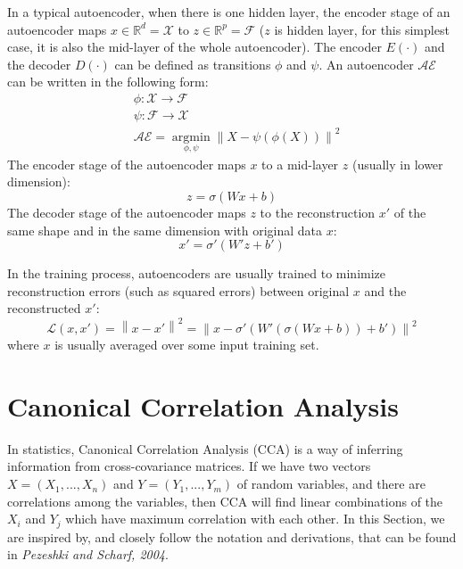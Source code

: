 \documentclass[12pt]{report} %
\newcommand{\norm}[1]{\left\lVert #1 \right\rVert}
\begin{document}
In a typical autoencoder, when there is one hidden layer, the encoder stage of an autoencoder maps \(x\in \mathbb{R}^{d}=\mathcal{X}\) to \(z\in \mathbb{R}^{p}=\mathcal{F}\) ($z$ is hidden layer, for this simplest case, it is also the mid-layer of the whole autoencoder). The encoder \(E(\cdot)\) and the decoder \(D(\cdot)\) can be defined as transitions $\phi$ and $\psi$. An autoencoder $\mathcal{AE}$ can be written in the following form:
\begin{equation}
\begin{split}
& \phi:\mathcal{X}\to\mathcal{F} \\
& \psi:\mathcal{F}\to\mathcal{X} \\
& \mathcal{AE}=\operatorname*{argmin}_{\phi,\psi} \norm{X-\psi(\phi(X))}^2
\end{split}
\end{equation}
The encoder stage of the autoencoder maps $x$ to a mid-layer $z$ (usually in lower dimension):
\begin{equation}
z=\sigma(Wx+b)
\end{equation}
The decoder stage of the autoencoder maps $z$ to the reconstruction $x'$  of the same shape and in the same dimension with original data $x$:
\begin{equation}
x'=\sigma'(W'z+b')
\end{equation}

In the training process, autoencoders are usually trained to minimize reconstruction errors (such as squared errors) between original $x$ and the reconstructed $x'$:
\begin{equation}
\mathcal{L}(x,x')=\norm{x-x'}^2=\norm{x-\sigma'(W'(\sigma(Wx+b))+b')}^2
\end{equation}
where $x$ is usually averaged over some input training set\cite{AE}.

\section{Canonical Correlation Analysis}
In statistics, Canonical Correlation Analysis (CCA) is a way of inferring information from cross-covariance matrices. If we have two vectors \(X = (X_{1}, ..., X_{n})\) and \(Y = (Y_{1}, ..., Y_{m})\) of random variables, and there are correlations among the variables, then CCA will find linear combinations of the $X_{i}$ and $Y_{j}$ which have maximum correlation with each other\cite{CCA}. In this Section, we are inspired by, and closely follow the notation and derivations, that can be found in \textit{Pezeshki and Scharf, 2004}\cite{ECCA}.
\end{document}
